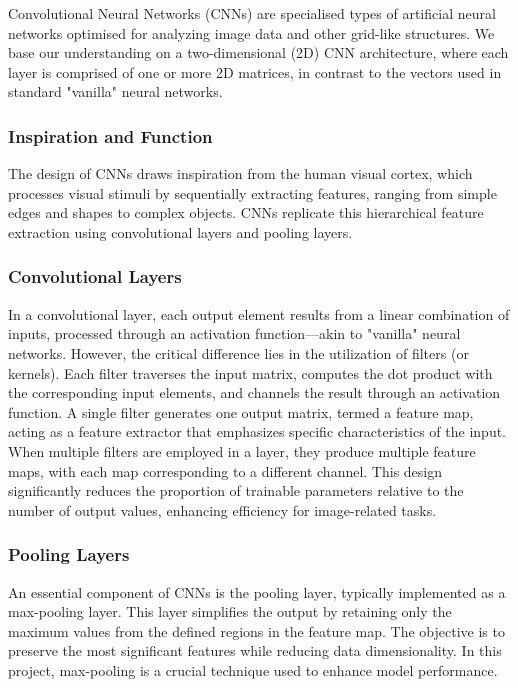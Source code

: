 \documentclass[12pt]{article}
\begin{document}
Convolutional Neural Networks (CNNs) are specialised types of artificial neural networks optimised for analyzing image data and other grid-like structures. We base our understanding on a two-dimensional (2D) CNN architecture, where each layer is comprised of one or more 2D matrices, in contrast to the vectors used in standard "vanilla" neural networks.

\subsubsection*{Inspiration and Function}

The design of CNNs draws inspiration from the human visual cortex, which processes visual stimuli by sequentially extracting features, ranging from simple edges and shapes to complex objects. CNNs replicate this hierarchical feature extraction using convolutional layers and pooling layers. 

\subsubsection*{Convolutional Layers}

In a convolutional layer, each output element results from a linear combination of inputs, processed through an activation function—akin to "vanilla" neural networks. However, the critical difference lies in the utilization of filters (or kernels). Each filter traverses the input matrix, computes the dot product with the corresponding input elements, and channels the result through an activation function. 
A single filter generates one output matrix, termed a feature map, acting as a feature extractor that emphasizes specific characteristics of the input. 
When multiple filters are employed in a layer, they produce multiple feature maps, with each map corresponding to a different channel. 
This design significantly reduces the proportion of trainable parameters relative to the number of output values, enhancing efficiency for image-related tasks.

\subsubsection*{Pooling Layers}

An essential component of CNNs is the pooling layer, typically implemented as a max-pooling layer. This layer simplifies the output by retaining only the maximum values from the defined regions in the feature map. The objective is to preserve the most significant features while reducing data dimensionality. In this project, max-pooling is a crucial technique used to enhance model performance.
\end{document}
